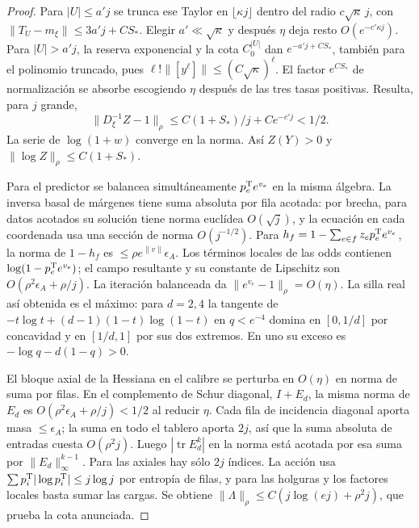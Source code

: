 \begin{proof}
Para \(|U|\le a'j\) se trunca ese Taylor en \(\lfloor\kappa j\rfloor\) dentro del radio
\(c\sqrt\kappa\,j\), con \(\|T_U-m_\xi\|\le3a'j+CS_*\). Elegir
\(a'\ll\sqrt\kappa\) y después \(\eta\) deja resto \(O(e^{-c'\kappa j})\).
Para \(|U|>a'j\), la reserva exponencial y la cota \(C_0^{|U|}\) dan \(e^{-a'j+CS_*}\),
también para el polinomio truncado, pues \(\ell!\|[y^\ell]\|\le(C\sqrt\kappa)^\ell\).
El factor \(e^{CS_*}\) de normalización se absorbe escogiendo \(\eta\) después de las tres
tasas positivas. Resulta, para \(j\) grande,
\begin{equation}\label{eq:positividad-cubo}
 \|D_\xi^{-1}Z-1\|_\rho\le C(1+S_*)/j+Ce^{-c'j}<1/2 .
\end{equation}
La serie de \(\log(1+w)\) converge en la norma. Así \(Z(Y)>0\) y
\(\|\log Z\|_\rho\le C(1+S_*)\).

Para el predictor se balancea simultáneamente \(p^{\rm T}_e e^{v_e}\) en la misma álgebra.
La inversa basal de márgenes tiene suma absoluta por fila acotada: por brecha, para datos
acotados su solución tiene norma euclídea \(O(\sqrt j)\), y la ecuación en cada coordenada
usa una sección de norma \(O(j^{-1/2})\). Para \(h_f=1-\sum_{e\in f}z_ep^{\rm T}_e e^{v_e}\),
la norma de \(1-h_f\) es \(\le \rho e^{\|v\|}\epsilon_A\).
Los términos locales de las odds contienen \(\log(1-p^{\rm T}_e e^{v_e})\); el campo resultante
y su constante de Lipschitz son \(O(\rho^2\epsilon_A+\rho/j)\). La iteración balanceada
da \(\|e^{v_e}-1\|_\rho=O(\eta)\). La silla real así obtenida es el máximo:
para \(d=2,4\) la tangente de \(-t\log t+(d-1)(1-t)\log(1-t)\) en \(q<e^{-4}\)
domina en \([0,1/d]\) por concavidad y en \([1/d,1]\) por sus dos extremos.
En uno su exceso es \(-\log q-d(1-q)>0\).

El bloque axial de la Hessiana en el calibre se perturba en \(O(\eta)\) en norma
de suma por filas. En el complemento de Schur diagonal, \(I+E_d\), la misma norma
de \(E_d\) es \(O(\rho^2\epsilon_A+\rho/j)<1/2\) al reducir \(\eta\). Cada fila de
incidencia diagonal aporta masa \(\le\epsilon_A\); la suma en todo el tablero aporta
\(2j\), así que la suma absoluta de entradas cuesta \(O(\rho^2j)\).
Luego \(|\operatorname{tr}E_d^k|\) en la norma está acotada por esa suma por
\(\|E_d\|_\infty^{k-1}\). Para las axiales hay sólo \(2j\) índices. La acción usa
\(\sum p^{\rm T}_i|\log p^{\rm T}_i|\le j\log j\) por entropía de filas, y para las holguras y los
factores locales basta sumar las cargas. Se obtiene
\(\|\Lambda\|_\rho\le C(j\log(ej)+\rho^2j)\), que prueba la cota anunciada.
\end{proof}

